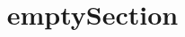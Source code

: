\documentclass[a4paper,11pt,oneside,openany,report]{jsbook}
\title{emptySection}
\begin{document}
\maketitle
\section{}
\end{document}

